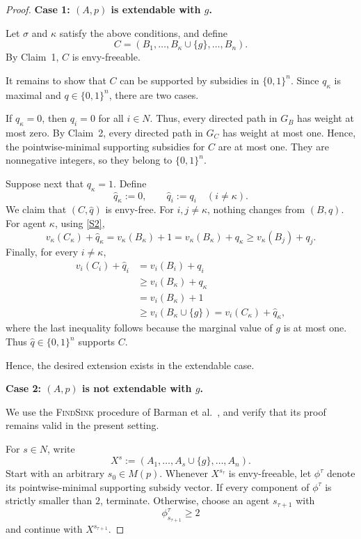 \begin{proof}
\medskip
\noindent
\textbf{Case 1: $(A,p)$ is extendable with $g$.}

Let $\sigma$ and $\kappa$ satisfy the above conditions, and define
\[
C=(B_1,\ldots,B_\kappa\cup\{g\},\ldots,B_n).
\]
By Claim~1, $C$ is envy-freeable.

It remains to show that $C$ can be supported by subsidies in $\{0,1\}^n$. Since $q_\kappa$ is maximal and
$q\in\{0,1\}^n$, there are two cases.

If $q_\kappa=0$, then $q_i=0$ for all $i\in N$. Thus, every directed path in $G_B$ has weight at most zero. By Claim~2, every directed path in $G_C$ has weight at most one. Hence, the pointwise-minimal supporting subsidies for $C$ are at most one. They are nonnegative integers, so they belong to $\{0,1\}^n$.

Suppose next that $q_\kappa=1$. Define
\[
\widehat q_\kappa:=0,
\qquad
\widehat q_i:=q_i
\quad (i\neq\kappa).
\]
We claim that $(C,\widehat q)$ is envy-free. For $i,j\neq\kappa$, nothing changes from $(B,q)$. For agent
$\kappa$, using \eqref{S2},
\[
v_\kappa(C_\kappa)+\widehat q_\kappa
=
v_\kappa(B_\kappa)+1
=
v_\kappa(B_\kappa)+q_\kappa
\geq
v_\kappa(B_j)+q_j.
\]
Finally, for every $i\neq\kappa$,
\[
\begin{aligned}
v_i(C_i)+\widehat q_i
&=v_i(B_i)+q_i\\
&\geq v_i(B_\kappa)+q_\kappa\\
&=v_i(B_\kappa)+1\\
&\geq v_i(B_\kappa\cup\{g\})
 =v_i(C_\kappa)+\widehat q_\kappa,
\end{aligned}
\]
where the last inequality follows because the marginal value of $g$ is at most one. Thus $\widehat q\in\{0,1\}^n$ supports $C$.

Hence, the desired extension exists in the extendable case.

\medskip
\noindent
\textbf{Case 2: $(A,p)$ is not extendable with $g$.}

We use the \textsc{FindSink} procedure of Barman et al.~\cite{BKNS22}, and verify that its proof remains valid in the
present setting.

For $s\in N$, write
\[
X^s:=(A_1,\ldots,A_s\cup\{g\},\ldots,A_n).
\]
Start with an arbitrary $s_0\in M(p)$. Whenever $X^{s_\tau}$ is envy-freeable, let $\phi^\tau$ denote its pointwise-minimal supporting subsidy vector. If every component of $\phi^\tau$ is strictly smaller than $2$, terminate. Otherwise, choose an agent
$s_{\tau+1}$ with
\[
\phi^\tau_{s_{\tau+1}}\geq2
\]
and continue with $X^{s_{\tau+1}}$.


\end{proof}
